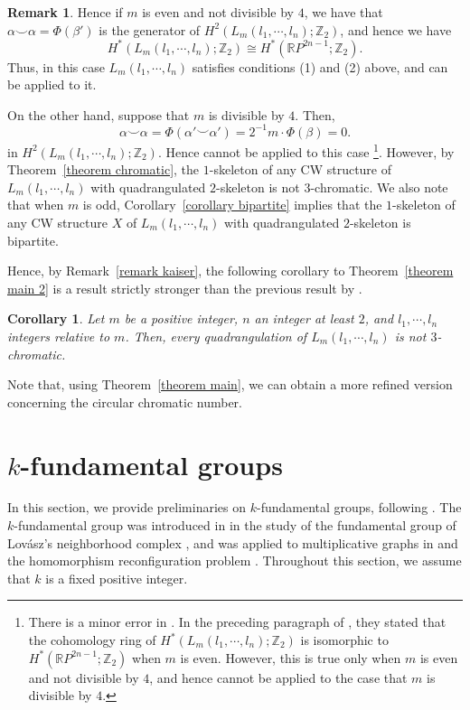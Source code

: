 \documentclass[11pt, amsfonts]{amsart}
\numberwithin{equation}{section}
\newtheorem{corollary}[thm]{Corollary}
\theoremstyle{definition}
\newtheorem{remark}[thm]{Remark}
\theoremstyle{remark}
\newcommand{\ZZ}{\mathbb{Z}}
\newcommand{\RR}{\mathbb{R}}
\begin{document}
\begin{remark}
Hence if $m$ is even and not divisible by $4$, we have that $\alpha \smile \alpha = \Phi(\beta')$ is the generator of $H^2(L_m(l_1, \cdots, l_n); \ZZ_2)$, and hence we have
\[ H^*(L_m(l_1, \cdots, l_n); \ZZ_2) \cong H^*(\RR P^{2n-1} ; \ZZ_2).\]
Thus, in this case $L_m(l_1, \cdots, l_n)$ satisfies conditions (1) and (2) above, and \cite[Theorem~4.1]{Kaiseretal} can be applied to it.

On the other hand, suppose that $m$ is divisible by $4$. Then,
\[ \alpha \smile \alpha = \Phi(\alpha' \smile \alpha') = 2^{-1}m \cdot \Phi(\beta) = 0.\]
in $H^2(L_m(l_1, \cdots, l_n); \ZZ_2)$.
Hence \cite[Theorem~4.1]{Kaiseretal} cannot be applied to this case\noindent
\footnote{There is a minor error in \cite{Kaiseretal}. In the preceding paragraph of \cite[Corollary~4.3]{Kaiseretal}, they stated that the cohomology ring of $H^*(L_m(l_1, \cdots, l_n); \ZZ_2)$ is isomorphic to $H^*(\RR P^{2n-1}; \ZZ_2)$ when $m$ is even. However, this is true only when $m$ is even and not divisible by $4
$, and hence \cite[Theorem~4.1]{Kaiseretal} cannot be applied to the case that $m$ is divisible by $4$.}.
However, by Theorem~\ref{theorem chromatic}, the $1$-skeleton of any CW structure of $L_m(l_1, \cdots, l_n)$ with quadrangulated $2$-skeleton is not $3$-chromatic. We also note that when $m$ is odd, Corollary~\ref{corollary bipartite} implies that the $1$-skeleton of any CW structure $X$ of $L_m(l_1, \cdots, l_n)$ with quadrangulated $2$-skeleton is bipartite.
\end{remark}

Hence, by Remark~\ref{remark kaiser}, the following corollary to Theorem~\ref{theorem main 2} is a result strictly stronger than the previous result by \cite[Corollary~4.3]{Kaiseretal}.

\begin{corollary}
Let $m$ be a positive integer, $n$ an integer at least $2$, and $l_1, \cdots, l_n$ integers relative to $m$. Then, every quadrangulation of $L_m(l_1, \cdots, l_n)$ is not $3$-chromatic.
\end{corollary}

Note that, using Theorem~\ref{theorem main}, we can obtain a more refined version concerning the circular chromatic number.

\section{$k$-fundamental groups}

In this section, we provide preliminaries on $k$-fundamental groups, following \cite{MatsushitaJMSUT}. The $k$-fundamental group was introduced in \cite{MatsushitaJMSUT} in the study of the fundamental group of Lov\'asz's neighborhood complex \cite{Lovasz}, and was applied to multiplicative graphs in \cite{TWSIAM, WrochnaJCTB} and the homomorphism reconfiguration problem \cite{Matsushita_arxiv}. Throughout this section, we assume that $k$ is a fixed positive integer.
\end{document}
